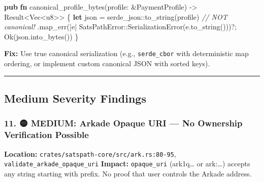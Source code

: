 \documentclass[
]{article}
\newenvironment{Shaded}{}{}
\newcommand{\CommentTok}[1]{\textcolor[rgb]{0.38,0.63,0.69}{\textit{#1}}}
\newcommand{\ConstantTok}[1]{\textcolor[rgb]{0.53,0.00,0.00}{#1}}
\newcommand{\DataTypeTok}[1]{\textcolor[rgb]{0.56,0.13,0.00}{#1}}
\newcommand{\KeywordTok}[1]{\textcolor[rgb]{0.00,0.44,0.13}{\textbf{#1}}}
\newcommand{\NormalTok}[1]{#1}
\newcommand{\OperatorTok}[1]{\textcolor[rgb]{0.40,0.40,0.40}{#1}}
\newcommand{\PreprocessorTok}[1]{\textcolor[rgb]{0.74,0.48,0.00}{#1}}
\begin{document}
\begin{Shaded}
\begin{Highlighting}[]
\KeywordTok{pub} \KeywordTok{fn}\NormalTok{ canonical\_profile\_bytes(profile}\OperatorTok{:} \OperatorTok{\&}\NormalTok{PaymentProfile) }\OperatorTok{{-}\textgreater{}} \DataTypeTok{Result}\OperatorTok{\textless{}}\DataTypeTok{Vec}\OperatorTok{\textless{}}\DataTypeTok{u8}\OperatorTok{\textgreater{}\textgreater{}} \OperatorTok{\{}
    \KeywordTok{let}\NormalTok{ json }\OperatorTok{=} \PreprocessorTok{serde\_json::}\NormalTok{to\_string(profile)  }\CommentTok{// NOT canonical!}
        \OperatorTok{.}\NormalTok{map\_err(}\OperatorTok{|}\NormalTok{e}\OperatorTok{|} \PreprocessorTok{SatsPathError::}\NormalTok{SerializationError(e}\OperatorTok{.}\NormalTok{to\_string()))}\OperatorTok{?;}
    \ConstantTok{Ok}\NormalTok{(json}\OperatorTok{.}\NormalTok{into\_bytes())}
\OperatorTok{\}}
\end{Highlighting}
\end{Shaded}

\textbf{Fix:} Use true canonical serialization (e.g.,
\texttt{serde\_cbor} with deterministic map ordering, or implement
custom canonical JSON with sorted keys).

\begin{center}\rule{0.5\linewidth}{0.5pt}\end{center}

\hypertarget{medium-severity-findings}{%
\subsection{Medium Severity Findings}\label{medium-severity-findings}}

\hypertarget{medium-arkade-opaque-uri-no-ownership-verification-possible}{%
\subsubsection{11. 🟡 MEDIUM: Arkade Opaque URI --- No Ownership
Verification
Possible}\label{medium-arkade-opaque-uri-no-ownership-verification-possible}}

\textbf{Location:} \texttt{crates/satspath-core/src/ark.rs:80-95},
\texttt{validate\_arkade\_opaque\_uri} \textbf{Impact:}
\texttt{opaque\_uri} (ark1q\ldots{} or ark:\ldots) accepts any string
starting with prefix. No proof that user controls the Arkade address.
\end{document}
